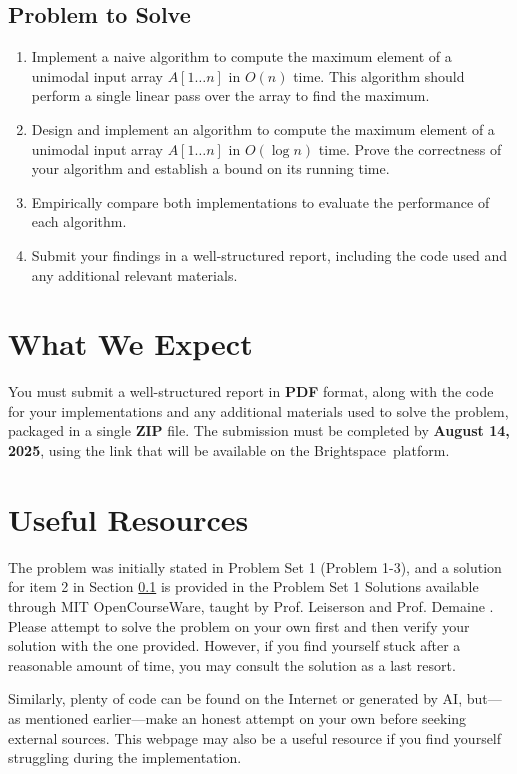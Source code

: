 \documentclass{article}
\begin{document}
\subsection{Problem to Solve}\label{sec:problem}
\begin{enumerate}
    \item Implement a naive algorithm to compute the maximum element of a unimodal input array $A[1 \ldots n]$ in $O(n)$ time. This algorithm should perform a single linear pass over the array to find the maximum.
    \item Design and implement an algorithm to compute the maximum element of a unimodal input array $A[1 \ldots n]$ in $O(\log n)$ time. Prove the correctness of your algorithm and establish a bound on its running time.
    \item Empirically compare both implementations to evaluate the performance of each algorithm.
    \item Submit your findings in a well-structured report, including the code used and any additional relevant materials.
\end{enumerate}

\section{What We Expect}
You must submit a well-structured report in \textbf{PDF} format, along with the code for your implementations and any additional materials used to solve the problem, packaged in a single \textbf{ZIP} file. The submission must be completed by \textbf{August 14, 2025}, using the link that will be available on the Brightspace\texttrademark\ platform.

\section{Useful Resources}
The problem was initially stated in Problem Set 1 (Problem 1-3), and a solution for item 2 in Section \ref{sec:problem} is provided in the Problem Set 1 Solutions available through MIT OpenCourseWare, taught by Prof. Leiserson and Prof. Demaine \cite{leiserson1:2005, leiserson2:2005}. Please attempt to solve the problem on your own first and then verify your solution with the one provided. However, if you find yourself stuck after a reasonable amount of time, you may consult the solution as a last resort.

Similarly, plenty of code can be found on the Internet or generated by AI, but—as mentioned earlier—make an honest attempt on your own before seeking external sources. This webpage \cite{gfg:2023} may also be a useful resource if you find yourself struggling during the implementation.



\end{document}
